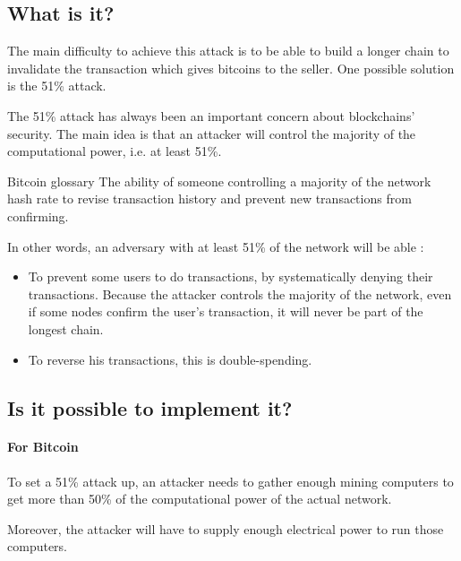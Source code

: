   \subsection{What is it?}

The main difficulty to achieve this attack is to be able to build a longer chain to invalidate the transaction which gives bitcoins to the seller. One possible solution is the 51\% attack.

The 51\% attack has always been an important concern about blockchains' security. The main idea is that an attacker will control the majority of the computational power, i.e. at least 51\%.

\clearpage

\begin{pquotation}{Bitcoin glossary \cite{51Percent_definition}}
The ability of someone controlling a majority of the network hash rate to revise transaction history and prevent new transactions from confirming.
\end{pquotation}

In other words, an adversary with at least 51\% of the network will be able :

\begin{itemize}
  \item To prevent some users to do transactions, by systematically denying their transactions. Because the attacker controls the majority of the network, even if some nodes confirm the user's transaction, it will never be part of the longest chain.
  \item To reverse his transactions, this is double-spending.
\end{itemize}

  \subsection{Is it possible to implement it?}

    \paragraph{For Bitcoin}

To set a 51\% attack up, an attacker needs to gather enough mining computers to get more than 50\% of the computational power of the actual network.

Moreover, the attacker will have to supply enough electrical power to run those computers. \newline

